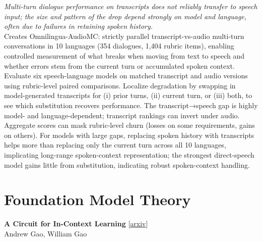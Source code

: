 \documentclass[12pt,letterpaper]{article}
\begin{document}
{\small\textit{Multi-turn dialogue performance on transcripts does not reliably transfer to speech input; the size and pattern of the drop depend strongly on model and language, often due to failures in retaining spoken history.}}\\[1pt]
{\footnotesize Creates Omnilingua-AudioMC: strictly parallel transcript-vs-audio multi-turn conversations in 10 languages (354 dialogues, 1,404 rubric items), enabling controlled measurement of what breaks when moving from text to speech and whether errors stem from the current turn or accumulated spoken context. Evaluate six speech-language models on matched transcript and audio versions using rubric-level paired comparisons. Localize degradation by swapping in model-generated transcripts for (i) prior turns, (ii) current turn, or (iii) both, to see which substitution recovers performance. The transcript→speech gap is highly model- and language-dependent; transcript rankings can invert under audio. Aggregate scores can mask rubric-level churn (losses on some requirements, gains on others). For models with large gaps, replacing spoken history with transcripts helps more than replacing only the current turn across all 10 languages, implicating long-range spoken-context representation; the strongest direct-speech model gains little from substitution, indicating robust spoken-context handling.}

\medskip


\section*{Foundation Model Theory}

{\small\textbf{A Circuit for In-Context Learning}} {\scriptsize[\href{https://arxiv.org/abs/2611.05344}{arxiv}]}\\
{\scriptsize Andrew Gao, William Gao}\\
\end{document}
